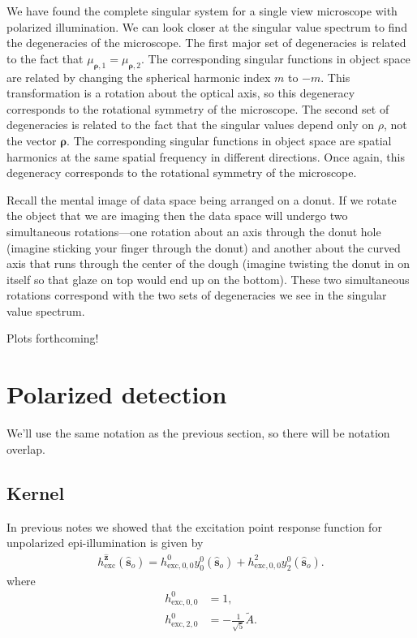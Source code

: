 \documentclass[11pt]{article}
\providecommand{\so}[1]{\mathbf{\hat{s}}_o}
\providecommand{\mh}[1]{\mathbf{\hat{#1}}}
\providecommand{\bs}[1]{\boldsymbol{#1}}
\begin{document}
We have found the complete singular system for a single view microscope with
polarized illumination. We can look closer at the singular value spectrum to
find the degeneracies of the microscope. The first major set of degeneracies is
related to the fact that $\mu_{\bs{\rho},1} = \mu_{\bs{\rho},2}$. The
corresponding singular functions in object space are related by changing the
spherical harmonic index $m$ to $-m$. This transformation is a rotation about
the optical axis, so this degeneracy corresponds to the rotational symmetry of
the microscope. The second set of degeneracies is related to the fact that the
singular values depend only on $\rho$, not the vector $\bs{\rho}$. The
corresponding singular functions in object space are spatial harmonics at the
same spatial frequency in different directions. Once again, this degeneracy
corresponds to the rotational symmetry of the microscope.

Recall the mental image of data space being arranged on a donut. If we rotate
the object that we are imaging then the data space will undergo two simultaneous
rotations---one rotation about an axis through the donut hole (imagine sticking
your finger through the donut) and another about the curved axis that runs
through the center of the dough (imagine twisting the donut in on itself so that
glaze on top would end up on the bottom). These two simultaneous rotations
correspond with the two sets of degeneracies we see in the singular value
spectrum.

Plots forthcoming!

\section{Polarized detection}
We'll use the same notation as the previous section, so there will be notation
overlap.

\subsection{Kernel}
In previous notes we showed that the excitation point response function for
unpolarized epi-illumination is given by
\begin{align}
  h_{\text{exc}}^{\mh{z}}(\so{}) = h_{\text{exc},0,0}^0y_0^0(\so{}) + h_{\text{exc},0,0}^2y_2^0(\so{}).
\end{align}
where
\begin{align}
  h_{\text{exc},0,0}^0 &= 1,\\
  h_{\text{exc},2,0}^0 &= -\frac{1}{\sqrt{5}}\tilde{A}.
\end{align}
\end{document}
